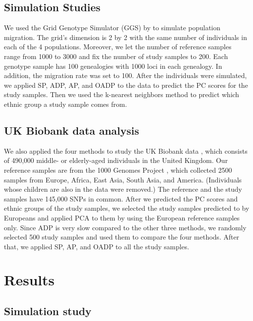 \documentclass{article}
\begin{document}
\subsection{Simulation Studies}

We used the Grid Genotype Simulator (GGS)
by \citet{ mathieson2012differential}
to simulate population migration.
The grid's dimension is 2 by 2
with the same number of individuals
in each of the 4 populations.
Moreover, we let the number of reference samples
range from 1000 to 3000
and fix the number of study samples to 200.
Each genotype sample has 100 genealogies
with 1000 loci in each genealogy.
In addition, the migration rate was set to 100.
After the individuals were simulated,
we applied SP, ADP, AP, and OADP to the data
to predict the PC scores for the study samples.
Then we used the k-nearest neighbors method
to predict which ethnic group a study sample comes from.

\subsection{UK Biobank data analysis}

We also applied the four methods
to study the UK Biobank data \citep{sudlow2015uk},
which consists of 490,000 middle- or elderly-aged individuals
in the United Kingdom.
Our reference samples
are from the 1000 Genomes Project \citep{10002015global},
which collected 2500 samples from Europe, Africa, East Asia, South Asia, and America.
(Individuals whose children are also in the data were removed.)
The reference and the study samples
have 145,000 SNPs in common.
After we predicted the PC scores and ethnic groups
of the study samples,
we selected the study samples predicted to by Europeans
and applied PCA to them
by using the European reference samples only.
Since ADP is very slow compared to the other three methods,
we randomly selected 500 study samples
and used them to compare the four methods.
After that,
we applied SP, AP, and OADP to all the study samples.


\section{Results}

\subsection{Simulation study}

\end{document}
